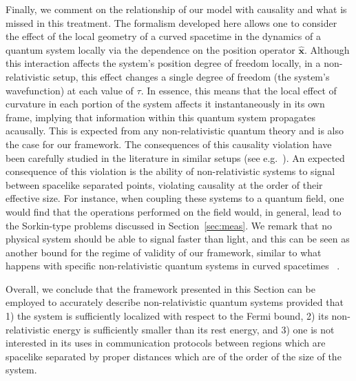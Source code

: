 \documentclass[letterpaper,12pt,titlepage,oneside,final]{book}
\newcommand{\ii}{\mathrm{i}}
\begin{document}
Finally, we comment on the relationship of our model with causality and what is missed in this treatment. The formalism developed here allows one to consider the effect of the local geometry of a curved spacetime in the dynamics of a quantum system locally via the dependence on the position operator $\hat{\bm x}$. Although this interaction affects the system's position degree of freedom locally, in a non-relativistic setup, this effect changes a single degree of freedom (the system's wavefunction) at each value of $\tau$. In essence, this means that the local effect of curvature in each portion of the system affects it instantaneously in its own frame, implying that information within this quantum system propagates acausally. This is expected from any non-relativistic quantum theory and is also the case for our framework. The consequences of this causality violation have been carefully studied in the literature in similar setups (see e.g.~\cite{us2,PipoFTL,BrunoDan}). An expected consequence of this violation is the ability of non-relativistic systems to signal between spacelike separated points, violating causality at the order of their effective size. For instance, when coupling these systems to a quantum field, one would find that the operations performed on the field would, in general, lead to the Sorkin-type problems discussed in Section~\ref{sec:meas}. We remark that no physical system should be able to signal faster than light, and this can be seen as another bound for the regime of validity of our framework, similar to what happens with specific non-relativistic quantum systems in curved spacetimes ~\cite{eduardo2015,us2,PipoFTL,mariaPipoNew}.

Overall, we conclude that the framework presented in this Section can be employed to accurately describe non-relativistic quantum systems provided that 1) the system is sufficiently localized with respect to the Fermi bound, 2) its non-relativistic energy is sufficiently smaller than its rest energy, and 3) one is not interested in its uses in communication protocols between regions which are spacelike separated by proper distances which are of the order of the size of the system. 

\end{document}
